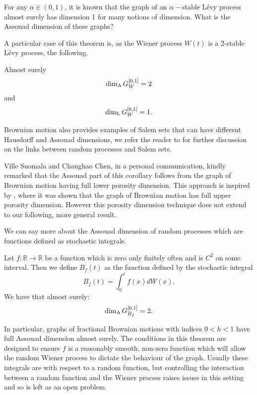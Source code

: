 \begin{question}
For any $\alpha \in (0,1)$, it is known that the graph of an $\alpha-$stable L\'evy process almost surely has dimension 1 for many notions of dimension. What is the Assouad dimension of these graphs?
\end{question}


A particular case of this theorem is, as the Wiener process $W(t)$ is a $2$-stable L\'evy process, the following.
\begin{corollary}
Almost surely
	\[
	\dim_{\textup{A}} G_{W}^{[0,1]}=2
	\]
	and 
	\[
	\dim_{\textup{L}} G_{W}^{[0,1]}=1.
	\]
\end{corollary}

Brownian motion also provides examples of Salem sets that can have different Hausdorff and Assouad dimensions, we refer the reader to \cite{Ka}  for further discussion on the links between random processes and Salem sets.

Ville Suomala and Changhao Chen, in a personal communication, kindly remarked that the Assouad part of this corollary follows from the graph of Brownian motion having full lower porosity dimension. This approach is inspired by \cite{coxgriffin}, where it was shown that the graph of Brownian motion has full upper porosity dimension. However this porosity dimension technique does not extend to our following, more general result.

We can say more about the Assouad dimension of random processes which are functions defined as stochastic integrals. 

\begin{theorem}\label{ch-brownian:stochastic}
	Let $f:\mathbb{R}\to\mathbb{R}$ be a function which is zero only finitely often and is $C^2$ on some interval. Then we define $B_f(t)$ as the function defined by the stochastic integral
	\[	
	B_f(t)=\int_0^t f(x) dW(x).
	\]
	We have that almost surely:
	\[
	\dim_{\textup{A}} G_{B_f}^{[0,1]}=2.
	\]
\end{theorem}

In particular, graphs of fractional Brownian motions with indices $0<h<1$ have full Assouad dimension almost surely. The conditions in this theorem are designed to ensure $f$ is a reasonably smooth, non-zero function which will allow the random Wiener process to dictate the behaviour of the graph. Usually these integrals are with respect to a random function, but controlling the interaction between a random function and the Wiener process raises issues in this setting and so is left as an open problem. 

